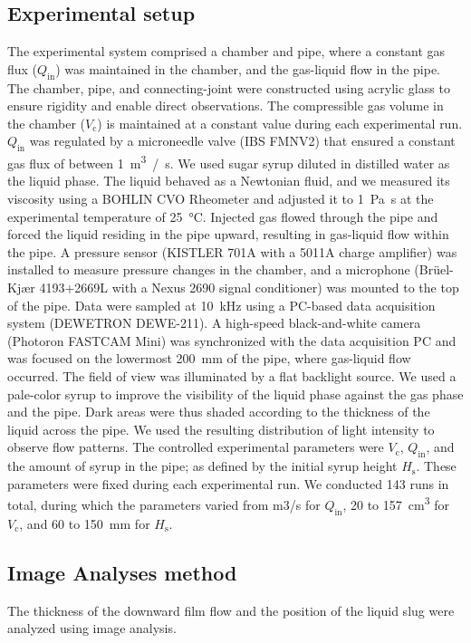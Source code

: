 \documentclass[aps,pre,preprint,groupedaddress,showkeys]{revtex4-2}
\begin{document}
\subsection{Experimental setup}\label{setup}
The experimental system comprised a chamber and pipe, where a constant gas flux ($Q_\mathrm{in}$) was maintained in the chamber, and the gas-liquid flow in the pipe. 
The chamber, pipe, and connecting-joint were constructed using acrylic glass to ensure rigidity and enable direct observations. 
The compressible gas volume in the chamber ($V_\mathrm{c}$) is maintained at a constant value during each experimental run.
$Q_\mathrm{in}$ was regulated by a microneedle valve (IBS FMNV2) that ensured a constant gas flux of between \SI{1}{\m^3 / \s}. 
We used sugar syrup diluted in distilled water as the liquid phase. 
The liquid behaved as a Newtonian fluid, and we measured its viscosity using a BOHLIN CVO Rheometer and adjusted it to \SI{1}{\Pa \s} at the experimental temperature of \SI{25}{\degreeCelsius}. 
Injected gas flowed through the pipe and forced the liquid residing in the pipe upward, resulting in gas-liquid flow within the pipe.
A pressure sensor (KISTLER 701A with a 5011A charge amplifier) was installed to measure pressure changes in the chamber, and a microphone (Br\"uel-Kj\ae r 4193+2669L with a Nexus 2690 signal conditioner) was mounted to the top of the pipe. Data were sampled at \SI{10}{kHz} using a PC-based data acquisition system (DEWETRON DEWE-211).
A high-speed black-and-white camera (Photoron FASTCAM Mini) was synchronized with the data acquisition PC and was focused on the lowermost \SI{200}{\mm} of the pipe, where gas-liquid flow occurred.
The field of view was illuminated by a flat backlight source. We used a pale-color syrup to improve the visibility of the liquid phase against the gas phase and the pipe. 
Dark areas were thus shaded according to the thickness of the liquid across the pipe. 
We used the resulting distribution of light intensity to observe flow patterns.
The controlled experimental parameters were $V_\mathrm{c}$, $Q_\mathrm{in}$, and the amount of syrup in the pipe; as defined by the initial syrup height $H_\mathrm{s}$. 
These parameters were fixed during each experimental run. 
We conducted 143 runs in total, during which the parameters varied from m3/s for $Q_\mathrm{in}$, 20 to \SI{157} {\cm^3} for $V_\mathrm{c}$, and 60 to \SI{150}{\mm} for $H_\mathrm{s}$.

\subsection{Image Analyses method}\label{ime}
The thickness of the downward film flow and the position of the liquid slug were analyzed using image analysis.
\end{document}
